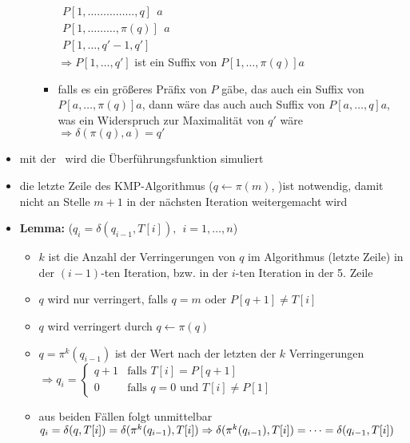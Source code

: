 \begin{itemize}[itemsep=-2pt]
\begin{enumerate}
\begin{itemize}
						$\begin{array}{r}
							P[1,\dots\dots\dots\dots\dots,q]~~a\\
							P[1,\dots\dots\dots,\pi(q)]~~a\\
							P[1,\dots,q'-1,q']
						\end{array}$\\
						$\Rightarrow P[1,\dots,q']$ ist ein Suffix von $P[1,\dots,\pi(q)]a$
						\item falls es ein größeres Präfix von $P$ gäbe, das auch ein Suffix von $P[a,\dots,\pi(q)]a$, dann wäre das auch auch Suffix von $P[a,\dots,q]a$, was ein Widerspruch zur Maximalität von $q'$ wäre\\
						$\Rightarrow \delta(\pi(q),a)=q'$
					\end{itemize}
		\end{enumerate}
	\item mit der \bound~wird die Überführungsfunktion simuliert
	\item die letzte Zeile des KMP-Algorithmus ($q\leftarrow\pi(m)$, )\algobreak ist notwendig, damit nicht an Stelle $m+1$ in der nächsten Iteration weitergemacht wird
	\item \textbf{Lemma:} ($q_i=\delta(q_{i-1},T[i]),~~i=1,\dots,n$)
		\vspace*{-1.5\baselineskip}\Proof\up
			\begin{itemize}[itemsep=0pt]
				\item $k$ ist die Anzahl der Verringerungen von $q$ im Algorithmus (letzte Zeile) in der $(i-1)$-ten Iteration, bzw. in der $i$-ten Iteration in der 5. Zeile
				\item $q$ wird nur verringert, falls $q=m$ oder $P[q+1]\neq T[i]$
				\item $q$ wird verringert durch $q \leftarrow \pi(q)$
				\item $q=\pi^k(q_{i-1})$ ist der Wert nach der letzten der $k$ Verringerungen\\
				$\Rightarrow q_i=\left\{\begin{array}{cl}
					q+1 & \text{falls }T[i]=P[q+1]\\
					0&\text{falls }q=0\text{ und }T[i]\neq P[1]
				\end{array}\right.$
				\item aus beiden Fällen folgt unmittelbar $q_i=\delta(q,T[i])=\delta(\pi^k(q_{i-1}),T[i])\\
				\Rightarrow \delta(\pi^k(q_{i-1}),T[i])=\dots=\delta(q_{i-1},T[i])$
			\end{itemize}

\end{itemize}

